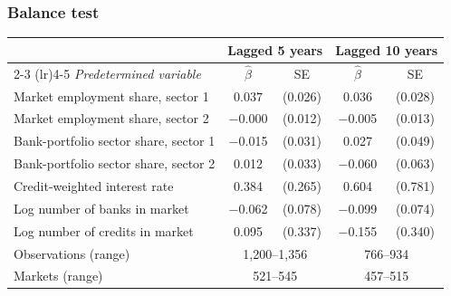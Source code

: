 \documentclass[aspectratio=169]{beamer}
\begin{document}
\begin{frame}[noframenumbering]
\frametitle{\textbf{Balance test}} \label{balance}

\begin{center}
    \footnotesize
    \begin{tabular}{lcccc}
        \toprule
        & \multicolumn{2}{c}{\textbf{Lagged 5 years}} & \multicolumn{2}{c}{\textbf{Lagged 10 years}} \\
        \cmidrule(lr){2-3} \cmidrule(lr){4-5}
        \textit{Predetermined variable} & $\widehat{\beta}$ & SE & $\widehat{\beta}$ & SE \\
        \midrule
        Market employment share, sector 1   & $0.037$ & (0.026) & \phantom{$-$}0.036 & (0.028) \\
        Market employment share, sector 2   & $-$0.000 & (0.012) & $-$0.005 & (0.013) \\
        Bank-portfolio sector share, sector 1 & $-$0.015 & (0.031) & \phantom{$-$}0.027 & (0.049) \\
        Bank-portfolio sector share, sector 2 & \phantom{$-$}0.012 & (0.033) & $-$0.060 & (0.063) \\
        Credit-weighted interest rate       & \phantom{$-$}0.384 & (0.265) & \phantom{$-$}0.604 & (0.781) \\
        Log number of banks in market       & $-$0.062 & (0.078) & $-$0.099 & (0.074) \\
        Log number of credits in market     & \phantom{$-$}0.095 & (0.337) & $-$0.155 & (0.340) \\
        \midrule
        Observations (range)              & \multicolumn{2}{c}{1{,}200--1{,}356} & \multicolumn{2}{c}{766--934} \\
        Markets (range)                   & \multicolumn{2}{c}{521--545} & \multicolumn{2}{c}{457--515} \\
        \bottomrule
    \end{tabular}
\end{center}

\hyperlink{robustness}{}

\end{frame}

\end{document}
